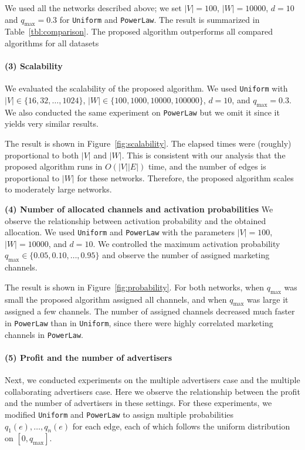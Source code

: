 \documentclass[letterpaper]{article}
\theoremstyle{definition}
\begin{document}
We used all the networks described above; we set $|V| = 100$, $|W| = 10000$, $d = 10$ and $q_{\text{max}} = 0.3$ for \texttt{Uniform} and \texttt{PowerLaw}.
The result is summarized in Table~\ref{tbl:comparison}.
The proposed algorithm outperforms all compared algorithms for all datasets


\vspace{-1.35mm}
\paragraph{(3) Scalability}

We evaluated the scalability of the proposed algorithm.
We used \texttt{Uniform} with $|V| \in \{16, 32, \ldots, 1024\}$, $|W| \in \{100, 1000, 10000, 100000\}$, $d = 10$, and $q_{\text{max}} = 0.3$.
We also conducted the same experiment on \texttt{PowerLaw} but we omit it since it yields very similar results.

The result is shown in Figure~\ref{fig:scalability}.
The elapsed times were (roughly) proportional to both $|V|$ and $|W|$.
This is consistent with our analysis that the proposed algorithm runs in $O(|V| |E|)$ time, and the number of edges is proportional to $|W|$ for these networks.
Therefore, the proposed algorithm scales to moderately large networks.

\textbf{(4) Number of allocated channels and activation probabilities} 
We observe the relationship between activation probability and the obtained allocation.
We used \texttt{Uniform} and \texttt{PowerLaw} with the parameters $|V| = 100$,  $|W| = 10000$, and $d = 10$.
We controlled the maximum activation probability $q_{\text{max}} \in \{0.05, 0.10, \ldots, 0.95\}$ and observe the number of assigned marketing channels.

The result is shown in Figure~\ref{fig:probability}.
For both networks, when $q_{\text{max}}$ was small the proposed algorithm assigned all channels, and when $q_{\text{max}}$ was large it assigned a few channels.
The number of assigned channels decreased much faster in \texttt{PowerLaw} than in \texttt{Uniform}, since there were highly correlated marketing channels in \texttt{PowerLaw}.

\paragraph{(5) Profit and the number of advertisers}

Next, we conducted experiments on the multiple advertisers case and the multiple collaborating advertisers case.
Here we observe the relationship between the profit and the number of advertisers in these settings.
For these experiments, we modified \texttt{Uniform} and \texttt{PowerLaw}
to assign multiple probabilities $q_1(e), \ldots, q_n(e)$ for each edge, each of which follows the uniform distribution on $[0, q_{\text{max}}]$.
\end{document}
